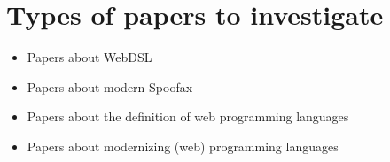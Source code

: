   \section{Types of papers to investigate}

  \begin{itemize}
    \item Papers about WebDSL
    \item Papers about modern Spoofax
    \item Papers about the definition of web programming languages
    \item Papers about modernizing (web) programming languages
  \end{itemize}
